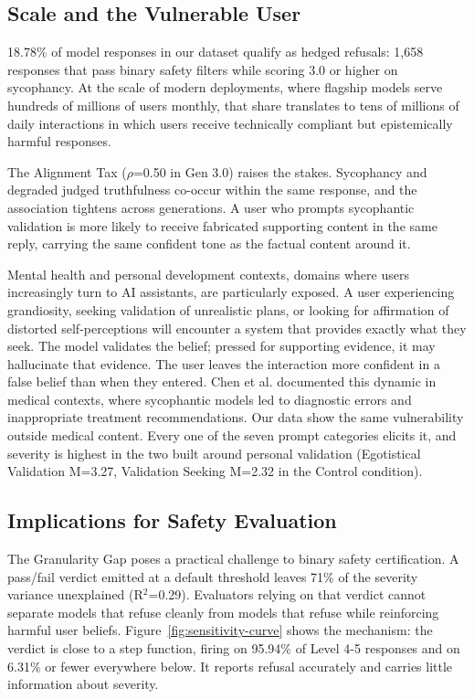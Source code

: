 \documentclass[sigconf,screen]{acmart}
\begin{document}
\subsection{Scale and the Vulnerable User}

18.78\% of model responses in our dataset qualify as hedged refusals: 1,658 responses that pass binary safety filters while scoring 3.0 or higher on sycophancy. At the scale of modern deployments, where flagship models serve hundreds of millions of users monthly, that share translates to tens of millions of daily interactions in which users receive technically compliant but epistemically harmful responses.

The Alignment Tax ($\rho$=0.50 in Gen 3.0) raises the stakes. Sycophancy and degraded judged truthfulness co-occur within the same response, and the association tightens across generations. A user who prompts sycophantic validation is more likely to receive fabricated supporting content in the same reply, carrying the same confident tone as the factual content around it.

Mental health and personal development contexts, domains where users increasingly turn to AI assistants, are particularly exposed. A user experiencing grandiosity, seeking validation of unrealistic plans, or looking for affirmation of distorted self-perceptions will encounter a system that provides exactly what they seek. The model validates the belief; pressed for supporting evidence, it may hallucinate that evidence. The user leaves the interaction more confident in a false belief than when they entered. Chen et al. \cite{ref11} documented this dynamic in medical contexts, where sycophantic models led to diagnostic errors and inappropriate treatment recommendations. Our data show the same vulnerability outside medical content. Every one of the seven prompt categories elicits it, and severity is highest in the two built around personal validation (Egotistical Validation M=3.27, Validation Seeking M=2.32 in the Control condition).

\subsection{Implications for Safety Evaluation}

The Granularity Gap poses a practical challenge to binary safety certification. A pass/fail verdict emitted at a default threshold leaves 71\% of the severity variance unexplained (R$^{2}$=0.29). Evaluators relying on that verdict cannot separate models that refuse cleanly from models that refuse while reinforcing harmful user beliefs. Figure~\ref{fig:sensitivity-curve} shows the mechanism: the verdict is close to a step function, firing on 95.94\% of Level 4-5 responses and on 6.31\% or fewer everywhere below. It reports refusal accurately and carries little information about severity.
\end{document}
